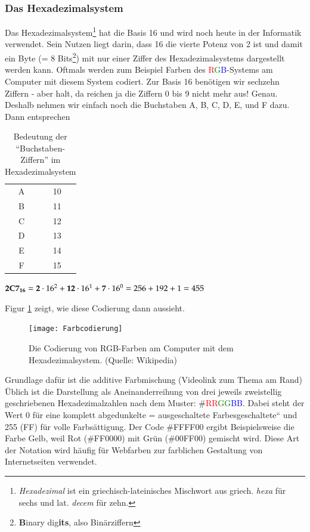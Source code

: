\subsubsection{Das Hexadezimalsystem}
Das Hexadezimalsystem\footnote{\emph{Hexadezimal} ist ein griechisch-lateinisches Mischwort aus griech. \emph{hexa} für sechs und lat. \emph{decem} für zehn.} hat die Basis 16 und wird noch heute in der Informatik verwendet. Sein Nutzen liegt darin, dass 16 die vierte Potenz von 2 ist und damit ein Byte (= 8 Bits\footnote{\textbf{B}inary dig\textbf{its}, also Binärziffern}) mit nur einer Ziffer des Hexadezimalsystems dargestellt werden kann. Oftmals werden zum Beispiel Farben des \textcolor{red}{R}\textcolor{green}{G}\textcolor{blue}{B}-Systems am Computer mit diesem System codiert. Zur Basis 16 benötigen wir sechzehn Ziffern - aber halt, da reichen ja die Ziffern 0 bis 9 nicht mehr aus! Genau. Deshalb nehmen wir einfach noch die Buchstaben A, B, C, D, E, und F dazu. Dann entsprechen

\begin{table}[H]
	\caption{Bedeutung der "`Buchstaben-Ziffern"' im Hexadezimalsystem}
	\centering
	\begin{tabular}{|c|c|}
		\hline
		A & 10 \\
		B & 11 \\
		C & 12 \\
		D & 13 \\
		E & 14 \\
		F & 15 \\
		\hline
	\end{tabular}
\end{table}

\begin{example}
		$\textbf{2C7\textsubscript{16}} = \textbf{2} \cdot 16^2 + \textbf{12} \cdot 16^1 + \textbf{7} \cdot 16^0 = 256 + 192 + 1 = 455 $
\end{example}

Figur \ref{fig:Farbcodierung} zeigt, wie diese Codierung dann aussieht.

\begin{figure}[h]
	\centering
	\texttt{[image: Farbcodierung]}
	\caption{Die Codierung von RGB-Farben am Computer mit dem Hexadezimalsystem. (Quelle: Wikipedia)}
	\label{fig:Farbcodierung}
\end{figure}

Grundlage dafür ist die additive Farbmischung (Videolink zum Thema am Rand) Üblich ist die Darstellung als Aneinanderreihung von drei jeweils zweistellig geschriebenen Hexadezimalzahlen nach dem Muster: \#\textcolor{red}{RR}\textcolor{green}{GG}\textcolor{blue}{BB}. Dabei steht der Wert 0 für eine komplett abgedunkelte = ausgeschaltete Farbesgeschaltete“ und 255 (FF) für volle Farbsättigung. Der Code \#FFFF00 ergibt Beispielsweise die Farbe Gelb, weil Rot (\#FF0000) mit Grün (\#00FF00) gemischt wird. Diese Art der Notation wird häufig für Webfarben zur farblichen Gestaltung von Internetseiten verwendet. 


